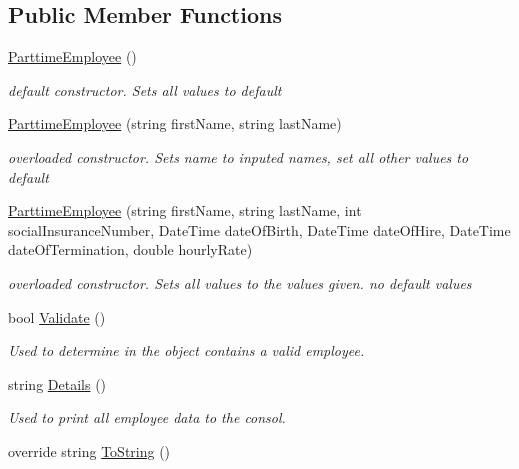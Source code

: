\subsection*{Public Member Functions}
\begin{DoxyCompactItemize}
\item 
\hyperlink{class_all_employees_1_1_parttime_employee_aefdb20ed1cc9fb007068380a97e3f51e}{Parttime\+Employee} ()
\begin{DoxyCompactList}\small\item\em default constructor. Sets all values to default \end{DoxyCompactList}\item 
\hyperlink{class_all_employees_1_1_parttime_employee_a9c867461dd13baee1e84702999817ffb}{Parttime\+Employee} (string first\+Name, string last\+Name)
\begin{DoxyCompactList}\small\item\em overloaded constructor. Sets name to inputed names, set all other values to default \end{DoxyCompactList}\item 
\hyperlink{class_all_employees_1_1_parttime_employee_a1560a81869cf2540d0eb7a6844196df8}{Parttime\+Employee} (string first\+Name, string last\+Name, int social\+Insurance\+Number, Date\+Time date\+Of\+Birth, Date\+Time date\+Of\+Hire, Date\+Time date\+Of\+Termination, double hourly\+Rate)
\begin{DoxyCompactList}\small\item\em overloaded constructor. Sets all values to the values given. no default values \end{DoxyCompactList}\item 
bool \hyperlink{class_all_employees_1_1_parttime_employee_ae9dfe4fa4f371c46c853cb499da663e7}{Validate} ()
\begin{DoxyCompactList}\small\item\em Used to determine in the object contains a valid employee. \end{DoxyCompactList}\item 
string \hyperlink{class_all_employees_1_1_parttime_employee_aab5cb221e05fda2cbac3d3ecb1398595}{Details} ()
\begin{DoxyCompactList}\small\item\em Used to print all employee data to the consol. \end{DoxyCompactList}\item 
override string \hyperlink{class_all_employees_1_1_parttime_employee_ab24493d33b967822f501bd92996a9e21}{To\+String} ()

\end{DoxyCompactItemize}
